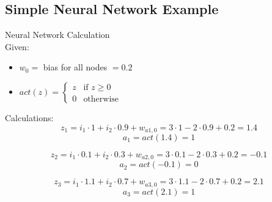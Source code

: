 
\subsection{Simple Neural Network Example}

\begin{example2}{Neural Network Calculation}\\
Given:
\begin{itemize}
    \item $w_0 =$ bias for all nodes $= 0.2$
    \item $act(z) = \begin{cases} z & \text{if } z \geq 0 \\ 0 & \text{otherwise} \end{cases}$
\end{itemize}

Calculations:
$$z_1 = i_1 \cdot 1 + i_2 \cdot 0.9 + w_{a1,0} = 3 \cdot 1 - 2 \cdot 0.9 + 0.2 = 1.4$$
$$a_1 = act(1.4) = 1$$

$$z_2 = i_1 \cdot 0.1 + i_2 \cdot 0.3 + w_{a2,0} = 3 \cdot 0.1 - 2 \cdot 0.3 + 0.2 = -0.1$$
$$a_2 = act(-0.1) = 0$$

$$z_3 = i_1 \cdot 1.1 + i_2 \cdot 0.7 + w_{a3,0} = 3 \cdot 1.1 - 2 \cdot 0.7 + 0.2 = 2.1$$
$$a_3 = act(2.1) = 1$$
\end{example2}

